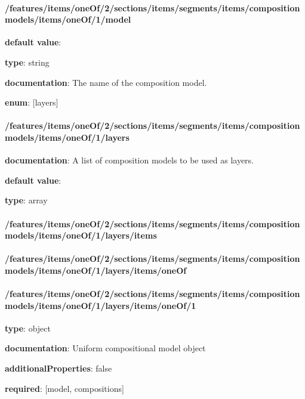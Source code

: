 \paragraph{/features/items/oneOf/2/sections/items/segments/items/composition models/items/oneOf/1/model} \begin{itemized}
\item {\bf default value}: 
\item {\bf type}: string
\item {\bf documentation}: The name of the composition model.
\item {\bf enum}: [layers]\end{itemized}\paragraph{/features/items/oneOf/2/sections/items/segments/items/composition models/items/oneOf/1/layers} \begin{itemized}
\item {\bf documentation}: A list of composition models to be used as layers.
\item {\bf default value}: 
\item {\bf type}: array
\paragraph{/features/items/oneOf/2/sections/items/segments/items/composition models/items/oneOf/1/layers/items} \begin{itemized}
\end{itemized}\end{itemized}\paragraph{/features/items/oneOf/2/sections/items/segments/items/composition models/items/oneOf/1/layers/items/oneOf} \begin{itemized}
\end{itemized}\paragraph{/features/items/oneOf/2/sections/items/segments/items/composition models/items/oneOf/1/layers/items/oneOf/1} \begin{itemized}
\item {\bf type}: object
\item {\bf documentation}: Uniform compositional model object
\item {\bf additionalProperties}: false
\item {\bf required}: [model, compositions]\end{itemized}
